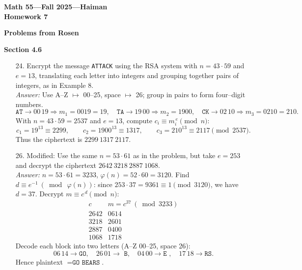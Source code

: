 \documentclass{article}
\begin{document}
\begin{center}
    \textbf{\LARGE Math 55—Fall 2025—Haiman} \\[6pt]
    \textbf{\Large Homework 7} \\[6pt]
\end{center}

\noindent \textbf{Problems from Rosen}

\medskip

\noindent \textbf{Section 4.6}
\begin{itemize}
    \item[24.] Encrypt the message \texttt{ATTACK} using the RSA system with $n = 43\cdot 59$ and $e=13$, translating each letter into integers and grouping together pairs of integers, as in Example 8.
    \medskip\\
    \textit{Answer:} Use A–Z $\mapsto$ 00–25, space $\mapsto$ 26; group in pairs to form four–digit numbers. \\
    \(\texttt{AT}\to 00\,19\Rightarrow m_1=0019=19,\quad \texttt{TA}\to 19\,00\Rightarrow m_2=1900,\quad \texttt{CK}\to 02\,10\Rightarrow m_3=0210=210.\) \\
    With $n=43\cdot 59=2537$ and $e=13$, compute $c_i\equiv m_i^{\,e}\pmod{n}$:
    \[
      c_1=19^{13}\equiv 2299,\qquad
      c_2=1900^{13}\equiv 1317,\qquad
      c_3=210^{13}\equiv 2117\pmod{2537}.
    \]
    Thus the ciphertext is \(\boxed{2299\ 1317\ 2117}\).

    \medskip

    \item[26.] Modified: Use the same $n = 53\cdot 61$ as in the problem, but take $e=253$ and decrypt the ciphertext \(2642\ 3218\ 2887\ 1068\).
    \medskip\\
    \textit{Answer:} $n=53\cdot 61=3233$, \(\varphi(n)=52\cdot 60=3120\). Find \(d\equiv e^{-1}\ (\bmod\ \varphi(n))\): since \(253\cdot 37=9361\equiv 1\pmod{3120}\), we have \(d=37\). Decrypt \(m\equiv c^{\,d}\pmod n\):
    \[
      \begin{array}{c|c}
        c & m=c^{37}\ (\bmod 3233)\\ \hline
        2642 & 0614\\
        3218 & 2601\\
        2887 & 0400\\
        1068 & 1718
      \end{array}
    \]
    Decode each block into two letters (A–Z 00–25, space 26):
    \[
       06\,14\to \texttt{GO},\quad 26\,01\to \texttt{~B},\quad 04\,00\to \texttt{E~},\quad 17\,18\to \texttt{RS}.
    \]
    Hence plaintext \(=\boxed{\texttt{GO BEARS}}\).


\end{itemize}
\end{document}

